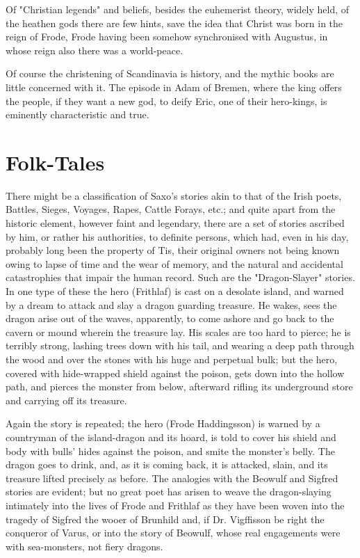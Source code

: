 \documentclass[10pt,a4paper]{report}
\begin{document}
Of "Christian legends" and beliefs, besides the euhemerist theory, widely held, of the heathen gods there are few hints, save the idea that Christ was born in the reign of Frode, Frode having been somehow synchronised with Augustus, in whose reign also there was a world-peace.

Of course the christening of Scandinavia is history, and the mythic books are little concerned with it. The episode in Adam of Bremen, where the king offers the people, if they want a new god, to deify Eric, one of their hero-kings, is eminently characteristic and true.





\chapter{Folk-Tales}

There might be a classification of Saxo's stories akin to that of the Irish poets, Battles, Sieges, Voyages, Rapes, Cattle Forays, etc.; and quite apart from the historic element, however faint and legendary, there are a set of stories ascribed by him, or rather his authorities, to definite persons, which had, even in his day, probably long been the property of Tis, their original owners not being known owing to lapse of time and the wear of memory, and the natural and accidental catastrophies that impair the human record. Such are the "Dragon-Slayer" stories. In one type of these the hero (Frithlaf) is cast on a desolate island, and warned by a dream to attack and slay a dragon guarding treasure. He wakes, sees the dragon arise out of the waves, apparently, to come ashore and go back to the cavern or mound wherein the treasure lay. His scales are too hard to pierce; he is terribly strong, lashing trees down with his tail, and wearing a deep path through the wood and over the stones with his huge and perpetual bulk; but the hero, covered with hide-wrapped shield against the poison, gets down into the hollow path, and pierces the monster from below, afterward rifling its underground store and carrying off its treasure.

Again the story is repeated; the hero (Frode Haddingsson) is warned by a countryman of the island-dragon and its hoard, is told to cover his shield and body with bulls' hides against the poison, and smite the monster's belly. The dragon goes to drink, and, as it is coming back, it is attacked, slain, and its treasure lifted precisely as before. The analogies with the Beowulf and Sigfred stories are evident; but no great poet has arisen to weave the dragon-slaying intimately into the lives of Frode and Frithlaf as they have been woven into the tragedy of Sigfred the wooer of Brunhild and, if Dr. Vigffisson be right the conqueror of Varus, or into the story of Beowulf, whose real engagements were with sea-monsters, not fiery dragons.
\end{document}
